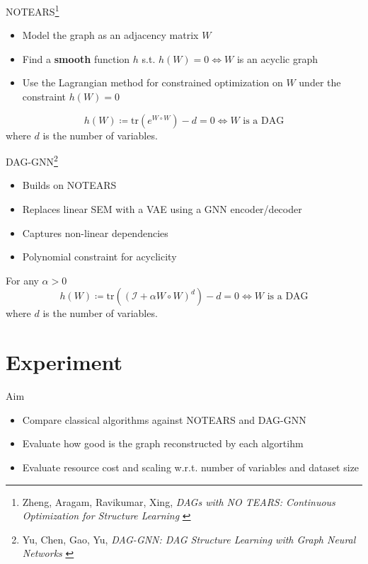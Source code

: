 \documentclass[aspectratio=169]{beamer}
\begin{document}
\begin{frame}{NOTEARS\footnote{Zheng, Aragam, Ravikumar, Xing, \emph{DAGs with NO TEARS: Continuous Optimization for Structure Learning} \cite{zheng2018dags}}}
    \begin{itemize}
        \item Model the graph as an adjacency matrix $W$
        \item Find a \textbf{smooth} function $h$ s.t. $h(W) = 0 \iff W$ is an acyclic graph
        \item Use the Lagrangian method for constrained optimization on $W$ under the constraint $h(W) = 0$
    \end{itemize}
    \vfill
    \begin{theorem}
        \[ h(W) \coloneqq \mathrm{tr}\left(e^{W \circ W}\right) - d = 0 \iff W \text{ is a DAG} \]
        where $d$ is the number of variables.
    \end{theorem}
\end{frame}

\begin{frame}{DAG-GNN\footnote{Yu, Chen, Gao, Yu, \emph{DAG-GNN: DAG Structure Learning with Graph Neural Networks} \cite{yu2019daggnn}}}
    \begin{itemize}
        \item Builds on NOTEARS
        \item Replaces linear SEM with a VAE using a GNN encoder/decoder
        \item Captures non-linear dependencies
        \item Polynomial constraint for acyclicity
    \end{itemize}
    \vfill
    \begin{theorem}
        For any $\alpha > 0$
        \[ h(W) \coloneqq \mathrm{tr}\left((\mathcal{I}+\alpha W\circ W)^d\right) - d = 0 \iff W \text{ is a DAG} \]
        where $d$ is the number of variables.
    \end{theorem}
\end{frame}

\section{Experiment}

\begin{frame}{Aim}
    \begin{itemize}
        \item Compare classical algorithms against NOTEARS and DAG-GNN
        \item Evaluate how good is the graph reconstructed by each algortihm
        \item Evaluate resource cost and scaling w.r.t. number of variables and dataset size
    \end{itemize}
\end{frame}
\end{document}
